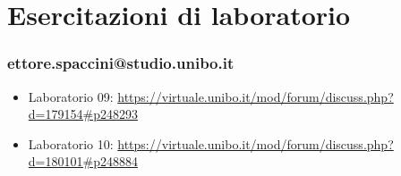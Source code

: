 \documentclass[a4paper,12pt]{report}
\begin{document}
\appendix
\chapter{Esercitazioni di laboratorio}

 
\subsection{ettore.spaccini@studio.unibo.it}

\begin{itemize}
 \item Laboratorio 09: \url{https://virtuale.unibo.it/mod/forum/discuss.php?d=179154#p248293}
 \item Laboratorio 10: \url{https://virtuale.unibo.it/mod/forum/discuss.php?d=180101#p248884}
\end{itemize}





\end{document}
